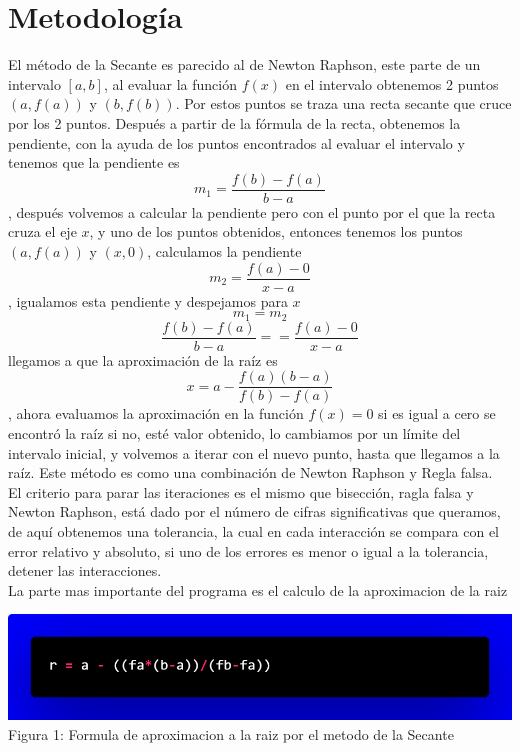 \documentclass[12pt]{article}
\begin{document}
		\section*{\centering Metodología}\label{sec:Metodologia}
			El método de la Secante es parecido al de Newton Raphson, este parte de un intervalo $ [a,b] $, al 
			evaluar la función $ f(x) $ en el intervalo obtenemos 2 puntos $ (a,f(a)) $ y $ (b,f(b)) $. Por estos 
			puntos se traza una recta secante que cruce por los 2 puntos. Después a partir de la fórmula de la 
			recta, obtenemos la pendiente, con la ayuda de los puntos encontrados al evaluar el intervalo y 
			tenemos que la pendiente es $$ m_1 = \frac{f(b)-f(a)}{b-a} $$, después volvemos a calcular la 
			pendiente pero con el punto por el que la recta cruza el eje $ x $, y uno de los puntos obtenidos, 
			entonces tenemos los puntos $ (a,f(a)) $ y $ (x,0) $, calculamos la pendiente $$ m_2 = \frac{f(a)-0}{x-a} $$, 
			igualamos esta pendiente y despejamos para $ x $ $$ m_1 = m_2 $$ $$ \frac{f(b)-f(a)}{b-a} = = \frac{f(a)-0}{x-a} $$ 
			llegamos a que la aproximación de la raíz es $$ x = a - \frac{f(a)(b-a)}{f(b)-f(a)} $$, ahora evaluamos la 
			aproximación en la función $ f(x) = 0 $ si es igual a cero se encontró la raíz si no, esté valor obtenido, 
			lo cambiamos por un límite del intervalo inicial, y volvemos a iterar con el nuevo punto, hasta que llegamos a la raíz. 
			Este método es como una combinación de Newton Raphson y Regla falsa.\\
			El criterio para parar las iteraciones es el mismo que bisección, ragla falsa y Newton Raphson, está dado por el número de cifras 
			significativas que queramos, de aquí obtenemos una tolerancia, la cual en cada interacción se 
			compara con el error relativo y absoluto, si uno de los errores es menor o igual a la tolerancia, 
			detener las interacciones.\\
			La parte mas importante del programa es el calculo de la aproximacion de la raiz
			\begin{center}
				\includegraphics[width=\linewidth]{Figura 1.png}
				Figura 1: Formula de aproximacion a la raiz por el metodo de la Secante		
			\end{center}
\end{document}
